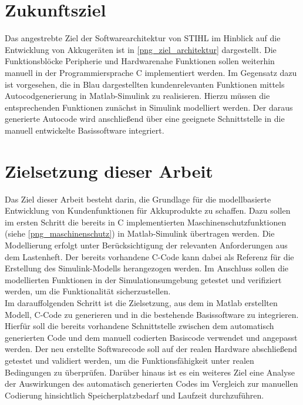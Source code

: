 \section{Zukunftsziel}
Das angestrebte Ziel der Softwarearchitektur von STIHL im Hinblick auf die Entwicklung von Akkugeräten ist in \autoref{png_ziel_architektur} dargestellt.
Die Funktionsblöcke \glqq Peripherie\grqq{} und \glqq Hardwarenahe Funktionen\grqq{} sollen weiterhin manuell in der Programmiersprache C implementiert werden. Im Gegensatz dazu ist vorgesehen, die in Blau dargestellten kundenrelevanten Funktionen mittels Autocodgenerierung in Matlab-Simulink zu realisieren. Hierzu müssen die entsprechenden Funktionen zunächst in Simulink modelliert werden. Der daraus generierte Autocode wird anschließend über eine geeignete Schnittstelle in die manuell entwickelte Basissoftware integriert.
\section{Zielsetzung dieser Arbeit}
Das Ziel dieser Arbeit besteht darin, die Grundlage für die modellbasierte Entwicklung von Kundenfunktionen für Akkuprodukte zu schaffen. Dazu sollen im ersten Schritt die bereits in C implementierten Maschinenschutzfunktionen (siehe \autoref{png_maschinenschutz}) in Matlab-Simulink übertragen werden.
Die Modellierung erfolgt unter Berücksichtigung der relevanten Anforderungen aus dem Lastenheft. Der bereits vorhandene C-Code kann dabei als Referenz für die Erstellung des Simulink-Modells herangezogen werden. Im Anschluss sollen die modellierten Funktionen in der Simulationsumgebung getestet und verifiziert werden, um die Funktionalität sicherzustellen.\\
Im darauffolgenden Schritt ist die Zielsetzung, aus dem in Matlab erstellten Modell, C-Code zu generieren und in die bestehende Basissoftware zu integrieren. Hierfür soll die bereits vorhandene Schnittstelle zwischen dem automatisch generierten Code und dem manuell codierten Basiscode verwendet und angepasst werden. Der neu erstellte Softwarecode soll auf der realen Hardware abschließend getestet und validiert werden, um die Funktionsfähigkeit unter realen Bedingungen zu überprüfen. Darüber hinaus ist es ein weiteres Ziel eine Analyse der Auswirkungen des automatisch generierten Codes im Vergleich zur manuellen Codierung hinsichtlich Speicherplatzbedarf und Laufzeit durchzuführen.

